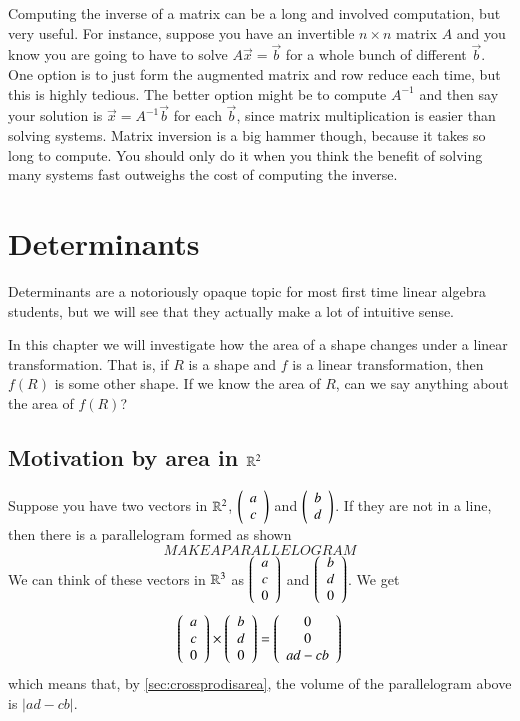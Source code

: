 Computing the inverse of a matrix can be a long and involved computation, but very useful.
For instance, suppose you have an invertible $n\times n$ matrix $A$ and you know you are going to have to solve $A\vec{x}=\vec{b}$ for a whole bunch of different $\vec{b}$.
One option is to just form the augmented matrix and row reduce each time, but this is highly tedious.
The better option might be to compute $A^{-1}$ and then say your solution is $\vec{x}=A^{-1}\vec{b}$ for each $\vec{b}$, since matrix multiplication is easier than solving systems.
Matrix inversion is a big hammer though, because it takes so long to compute.  
You should only do it when you think the benefit of solving many systems fast outweighs the cost of computing the inverse.

\exersisesp

\section{Determinants}

Determinants are a notoriously opaque topic for most first time linear algebra students, but we will see that they actually make a lot of intuitive sense.

In this chapter we will investigate how the area of a shape changes under a linear transformation.  
That is, if $R$ is a shape and $f$ is a linear transformation, then $f(R)$ is some other shape.
If we know the area of $R$, can we say anything about the area of $f(R)$?

\subsection{Motivation by area in $\mathbb{R}^2$}

Suppose you have two vectors in $\mathbb{R}^2$, $\left(\begin{array}{c}a\\c\end{array}\right)$ and $\left(\begin{array}{c}b\\d\end{array}\right)$.
If they are not in a line, then there is a parallelogram formed as shown
\[MAKE A PARALLELOGRAM\]
We can think of these vectors in $\mathbb{R}^3$ as $\left(\begin{array}{c}a\\c\\0\end{array}\right)$ and $\left(\begin{array}{c}b\\d\\0\end{array}\right)$.
We get
\[\left(\begin{array}{c}a\\c\\0\end{array}\right)\times\left(\begin{array}{c}b\\d\\0\end{array}\right) = \left(\begin{array}{c}0\\0\\ ad-cb\end{array}\right)\]
which means that, by \ref{sec:crossprodisarea}, the volume of the parallelogram above is $|ad-cb|$.  

